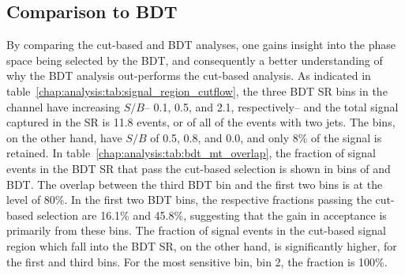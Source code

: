 \subsection{Comparison to BDT}

By comparing the cut-based and BDT analyses, one gains insight into
the phase space being selected by the BDT, and consequently a better
understanding of why the BDT analysis out-performs the cut-based
analysis. As indicated in
table~\ref{chap:analysis:tab:signal_region_cutflow}, the three BDT
SR bins in the \emme channel have increasing $S/B$-- 0.1, 0.5, and
2.1, respectively-- and the total signal captured in the SR is 11.8
events, or  of all of the \emme events with two jets.
The \mT bins, on the other hand, have $S/B$ of 0.5,
0.8, and 0.0, and only 8\% of the signal is retained. In
table~\ref{chap:analysis:tab:bdt_mt_overlap}, the fraction of signal
events in the BDT SR that pass the cut-based selection is shown in bins of \mT and
BDT. The overlap between the third BDT bin and the
first two \mT bins is at the level of 80\%. In the first two BDT bins,
the respective fractions passing the cut-based selection are 16.1\%
and 45.8\%, suggesting that the gain in acceptance is primarily from
these bins. The fraction of signal events in the
cut-based signal region which fall into the BDT SR, on the other hand,
is significantly higher,  for the first and third \mT
bins. For the most sensitive \mT bin, bin 2, the fraction is 100\%. 

\begin{table}[h]
\centering
\caption{Fraction of signal events in \emme events in BDT SR that also pass
  the cut-based selection split into BDT and \mT bins (e.g., 5.7\% of
  the signal falling in BDT bin 1 falls into \mT bin 2). ``All'' indicates
  the fraction when integrated over all \mT bins.}
\label{chap:analysis:tab:bdt_mt_overlap}
\end{table}

